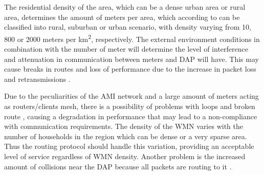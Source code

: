 \documentclass[conference]{IEEEtran}
\begin{document}
The residential density of the area, which can be a dense urban area or rural area, determines the amount of meters per area, which according to \cite{Plan2011} can be classified into rural, suburban or urban scenario, with density varying from 10, 800 or 2000 meters per km\textsuperscript{2}, respectively. The external environment conditions in combination with the number of meter will determine the level of interference and attenuation in communication between meters and DAP will have. This may cause breaks in routes and loss of performance due to the increase in packet loss and retransmissions \cite{farooq2013energy}. 


Due to the peculiarities of the AMI network and a large amount of meters acting as routers/clients mesh, there is a possibility of problems with loops and broken route \cite{ramachandran2007routing}, causing a degradation in performance that may lead to a non-compliance with communication requirements. The density of the WMN varies with the number of households in the region which can be dense or a very sparse area. Thus the routing protocol should handle this variation, providing an acceptable level of service regardless of WMN density. Another problem is the increased amount of collisions near the DAP because all packets are routing to it \cite{Saputro2012}.
\end{document}
